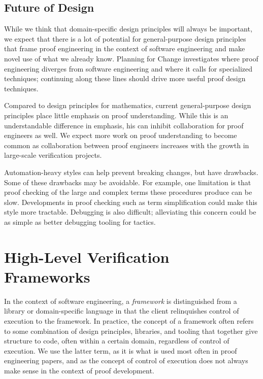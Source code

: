 \subsection{Future of Design}

While we think that domain-specific design principles will always be important, %
we expect that there is a lot of potential for general-purpose design principles that frame proof engineering
in the context of software engineering and make novel use of what we already know.
Planning for Change investigates where
proof engineering diverges from software engineering and where it calls for specialized techniques;
continuing along these lines should drive more useful proof design techniques.

Compared to design principles for mathematics, current general-purpose design principles place
little emphasis on proof understanding.  While this is
an understandable difference in emphasis,
his can inhibit collaboration for proof engineers as well. We expect more work on proof
understanding to become common as collaboration between proof
engineers increases with the growth in large-scale verification
projects.

Automation-heavy styles can help prevent breaking changes, but have
drawbacks. Some of these drawbacks may be avoidable.  For example, one
limitation is that proof checking of the large and complex terms
these procedures produce can be slow.  Developments in proof checking such
as term simplification could make this style more tractable. Debugging
is also difficult; alleviating this concern could be as simple as
better debugging tooling for tactics.


\section{High-Level Verification Frameworks}
\label{sec:frameworks}

In the context of software engineering, a \textit{framework} is distinguished from a library or domain-specific language
in that the client relinquishes control of execution to the framework. In practice,
the concept of a framework often refers to some combination of design principles,
libraries, and tooling that together give structure to code, often within a certain domain,
regardless of control of execution. We use the latter term, as it is what is used most often
in proof engineering papers, and as the concept of control of execution does not
always make sense in the context of proof development.


